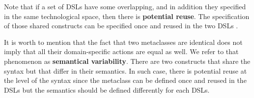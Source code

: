 Note that if a set of DSLs have some overlapping, and in addition they specified in the same technological space, then there is \textbf{potential reuse}. The specification of those shared constructs can be specified once and reused in the two DSLs \cite[p. 60-61]{voelter:2013}.


It is worth to mention that the fact that two metaclasses are identical does not imply that all their domain-specific actions are equal as well. We refer to that phenomenon as \textbf{semantical variability}. There are two constructs that share the syntax but that differ in their semantics. In such case, there is potential reuse at the level of the syntax since the metaclass can be defined once and reused in the DSLs but the semantics should be defined differently for each DSLs. 









